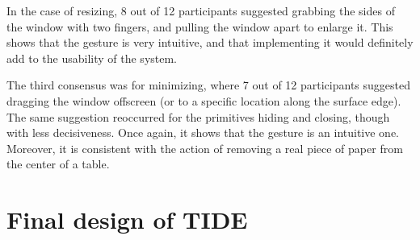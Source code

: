 In the case of resizing, 8 out of 12 participants suggested grabbing the sides of the window with two fingers, and pulling the window apart to enlarge it.
This shows that the gesture is very intuitive, and that implementing it would definitely add to the usability of the system.

The third consensus was for minimizing, where 7 out of 12 participants suggested dragging the window offscreen (or to a specific location along the surface edge).
The same suggestion reoccurred for the primitives hiding and closing, though with less decisiveness.
Once again, it shows that the gesture is an intuitive one.
Moreover, it is consistent with the action of removing a real piece of paper from the center of a table.

\clearpage
\section{Final design of TIDE}
\label{sec:design}

